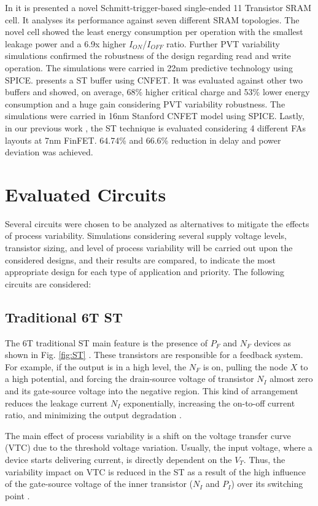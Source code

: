 \documentclass[diss,pgmicro,english]{iiufrgs}
\begin{document}
 In \cite{ahmad2016single} it is presented a novel Schmitt-trigger-based single-ended 11 Transistor SRAM cell. It analyses its performance against seven different SRAM topologies. The novel cell showed the least energy consumption per operation with the smallest leakage power and a 6.9x higher $I_{ON}$/$I_{OFF}$ ratio. Further PVT variability simulations confirmed the robustness of the design regarding read and write operation. The simulations were carried in 22nm predictive technology using SPICE. \cite{moghaddam2017design} presents a ST buffer using CNFET. It was evaluated against other two buffers and showed, on average, 68\% higher critical charge and 53\% lower energy consumption and a huge gain considering PVT variability robustness. The simulations were carried in 16nm Stanford CNFET model using SPICE. Lastly, in our previous work \cite{moraes2018evaluation}, the ST technique is evaluated considering 4 different FAs layouts at 7nm FinFET. 64.74\% and 66.6\% reduction in delay and power deviation was achieved.

\section{Evaluated Circuits}

Several circuits were chosen to be analyzed as alternatives to mitigate the effects of process variability. Simulations considering several supply voltage levels, transistor sizing, and level of process variability will be carried out upon the considered designs, and their results are compared, to indicate the most appropriate design for each type of application and priority. The following circuits are considered:


\subsection{Traditional 6T ST}
The 6T traditional ST main feature is the presence of ${P_F}$ and ${N_F}$ devices as shown in Fig. \ref{fig:ST} \cite{doki1984cmos}. These transistors are responsible for a feedback system. For example, if the output is in a high level, the ${N_F}$ is on, pulling the node ${X}$ to a high potential, and forcing the drain-source voltage of transistor ${N_I}$ almost zero and its gate-source voltage into the negative region. This kind of arrangement reduces the leakage current ${N_I}$ exponentially, increasing the on-to-off current ratio, and minimizing the output degradation \cite{lotze2017ultra}.

The main effect of process variability is a shift on the voltage transfer curve (VTC) due to the threshold voltage variation. Usually, the input voltage, where a device starts delivering current, is directly dependent on the $V_T$. Thus, the variability impact on VTC is reduced in the ST as a result of the high influence of the gate-source voltage of the inner transistor ($N_I$ and $P_I$) over its switching point \cite{lotze2017ultra}.
\end{document}
